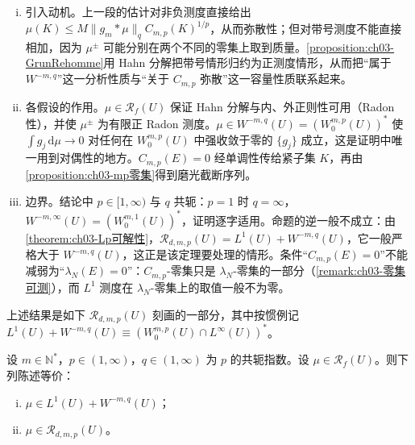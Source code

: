 \documentclass[../../main.tex]{subfiles}%
\begin{document}
\begin{remark}\label{remark:ch03-GrunRehomme动机}
\begin{enumerate}[(i)]
\item 引入动机。上一段的估计对非负测度直接给出 $\mu(K)\leqslant M\|g_m*\mu\|_qC_{m,p}(K)^{1/p}$，从而弥散性；但对带号测度不能直接相加，因为 $\mu^\pm$ 可能分别在两个不同的零集上取到质量。\cref{proposition:ch03-GrunRehomme}用 Hahn 分解把带号情形归约为正测度情形，从而把“属于 $W^{-m,q}$”这一分析性质与“关于 $C_{m,p}$ 弥散”这一容量性质联系起来。
\item 各假设的作用。$\mu\in\mathscr{R}_f(U)$ 保证 Hahn 分解与内、外正则性可用（Radon 性），并使 $\mu^\pm$ 为有限正 Radon 测度。$\mu\in W^{-m,q}(U)=(W^{m,p}_0(U))^*$ 使 $\int g_j\,\mathrm{d}\mu\to0$ 对任何在 $W^{m,p}_0(U)$ 中强收敛于零的 $\{g_j\}$ 成立，这是证明中唯一用到对偶性的地方。$C_{m,p}(E)=0$ 经单调性传给紧子集 $K$，再由\cref{proposition:ch03-mp零集}得到磨光截断序列。
\item 边界。结论中 $p\in[1,\infty)$ 与 $q$ 共轭：$p=1$ 时 $q=\infty$，$W^{-m,\infty}(U)=(W^{m,1}_0(U))^*$，证明逐字适用。命题的逆一般不成立：由\cref{theorem:ch03-Lp可解性}，$\mathscr{R}_{d,m,p}(U)=L^1(U)+W^{-m,q}(U)$，它一般严格大于 $W^{-m,q}(U)$，这正是该定理要处理的情形。条件“$C_{m,p}(E)=0$”不能减弱为“$\lambda_N(E)=0$”：$C_{m,p}$-零集只是 $\lambda_N$-零集的一部分（\cref{remark:ch03-零集可测}），而 $L^1$ 测度在 $\lambda_N$-零集上的取值一般不为零。
\end{enumerate}
\end{remark}

上述结果是如下 $\mathscr{R}_{d,m,p}(U)$ 刻画的一部分，其中按惯例记 $L^1(U)+W^{-m,q}(U)\equiv(W^{m,p}_0(U)\cap L^\infty(U))^*$。

\begin{theorem}\label{theorem:ch03-Lp可解性}\label{theorem:ch03-奇性}
设 $m\in\mathbb{N}^*$，$p\in(1,\infty)$，$q\in(1,\infty)$ 为 $p$ 的共轭指数。设 $\mu\in\mathscr{R}_f(U)$。则下列陈述等价：
\begin{enumerate}[(i)]
\item $\mu\in L^1(U)+W^{-m,q}(U)$；
\item $\mu\in\mathscr{R}_{d,m,p}(U)$。
\end{enumerate}
\end{theorem}
\end{document}
